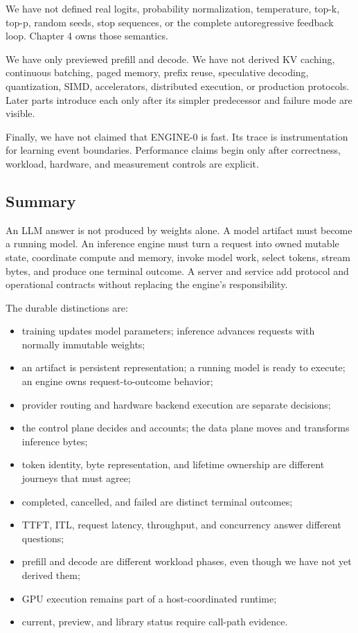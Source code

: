 \documentclass[
  10pt,
]{article}
\providecommand{\tightlist}{%
  \setlength{\itemsep}{0pt}\setlength{\parskip}{0pt}}
\begin{document}
We have not defined real logits, probability normalization, temperature,
top-k, top-p, random seeds, stop sequences, or the complete
autoregressive feedback loop. Chapter 4 owns those semantics.

We have only previewed prefill and decode. We have not derived KV
caching, continuous batching, paged memory, prefix reuse, speculative
decoding, quantization, SIMD, accelerators, distributed execution, or
production protocols. Later parts introduce each only after its simpler
predecessor and failure mode are visible.

Finally, we have not claimed that ENGINE-0 is fast. Its trace is
instrumentation for learning event boundaries. Performance claims begin
only after correctness, workload, hardware, and measurement controls are
explicit.

\subsection{Summary}\label{summary}

An LLM answer is not produced by weights alone. A model artifact must
become a running model. An inference engine must turn a request into
owned mutable state, coordinate compute and memory, invoke model work,
select tokens, stream bytes, and produce one terminal outcome. A server
and service add protocol and operational contracts without replacing the
engine's responsibility.

The durable distinctions are:

\begin{itemize}
\tightlist
\item
  training updates model parameters; inference advances requests with
  normally immutable weights;
\item
  an artifact is persistent representation; a running model is ready to
  execute; an engine owns request-to-outcome behavior;
\item
  provider routing and hardware backend execution are separate
  decisions;
\item
  the control plane decides and accounts; the data plane moves and
  transforms inference bytes;
\item
  token identity, byte representation, and lifetime ownership are
  different journeys that must agree;
\item
  completed, cancelled, and failed are distinct terminal outcomes;
\item
  TTFT, ITL, request latency, throughput, and concurrency answer
  different questions;
\item
  prefill and decode are different workload phases, even though we have
  not yet derived them;
\item
  GPU execution remains part of a host-coordinated runtime;
\item
  current, preview, and library status require call-path evidence.
\end{itemize}
\end{document}
